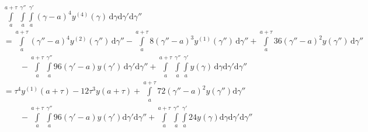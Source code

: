 \documentclass{article}
\begin{document}
\begin{equation}\label{eqn.48}
\begin{split}
&\int\limits_{a}^{a+\tau}\int\limits_{a}^{\gamma''}\int\limits_{a}^{\gamma'} (\gamma-a)^4 y^{(4)}(\gamma)\, \mathrm{d}\gamma \mathrm{d}\gamma'\mathrm{d}\gamma''\\ 
& = \int\limits_{a}^{a+\tau}(\gamma''-a)^4 y^{(2)}(\gamma'')\, \mathrm{d}  \gamma''- \int\limits_{a}^{a+\tau}8(\gamma''-a)^3 y^{(1)}(\gamma'')\, \mathrm{d}\gamma'' + \int\limits_{a}^{a+\tau}36(\gamma''-a)^{2} y(\gamma'')\, \mathrm{d}\gamma''\\
&\qquad{} - \int\limits_{a}^{a+\tau}\int\limits_{a}^{\gamma''} 96(\gamma'-a) y(\gamma')\, \mathrm{d}\gamma'\mathrm{d}\gamma'' + \int\limits_{a}^{a+\tau}\int\limits_{a}^{\gamma''}\int\limits_{a}^{\gamma'} y(\gamma)\, \mathrm{d}\gamma \mathrm{d}\gamma' \mathrm{d}\gamma''\\
& = \tau^{4}y^{(1)}(a+\tau) - 12\tau^{3}y(a+\tau) + \int\limits_{a}^{a+\tau}72(\gamma''-a)^{2}y(\gamma'')\mathrm{d}\gamma''\\&\qquad{} - \int\limits_{a}^{a+\tau}\int\limits_{a}^{\gamma''}96(\gamma'-a)y(\gamma')\mathrm{d}\gamma'\mathrm{d}\gamma''+ \int\limits_{a}^{a+\tau}\int\limits_{a}^{\gamma''}\int\limits_{a}^{\gamma'} 24 y(\gamma)\mathrm{d}\gamma\mathrm{d}\gamma'\mathrm{d}\gamma''
\end{split}
\end{equation}
\end{document}
